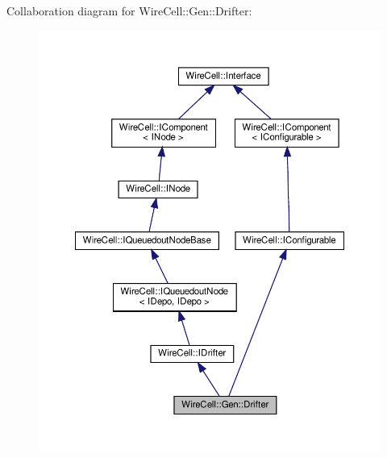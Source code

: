 Collaboration diagram for Wire\+Cell\+:\+:Gen\+:\+:Drifter\+:
\nopagebreak
\begin{figure}[H]
\begin{center}
\leavevmode
\includegraphics[width=350pt]{class_wire_cell_1_1_gen_1_1_drifter__coll__graph}
\end{center}
\end{figure}
